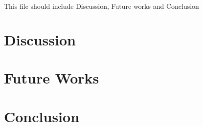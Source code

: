 This file should include Discussion, Future works and Conclusion
\chapter{Discussion}


\chapter{Future Works}


\chapter {Conclusion}
